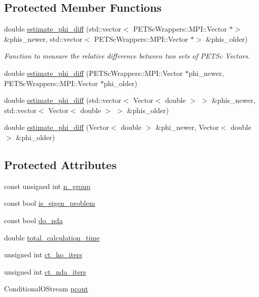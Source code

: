 \subsection*{Protected Member Functions}
\begin{DoxyCompactItemize}
\item 
double \hyperlink{class_iteration_base_a8bcba214850c5d47f5ae38fb98f51a44}{estimate\+\_\+phi\+\_\+diff} (std\+::vector$<$ P\+E\+T\+Sc\+Wrappers\+::\+M\+P\+I\+::\+Vector $\ast$$>$ \&phis\+\_\+newer, std\+::vector$<$ P\+E\+T\+Sc\+Wrappers\+::\+M\+P\+I\+::\+Vector $\ast$$>$ \&phis\+\_\+older)
\begin{DoxyCompactList}\small\item\em Function to measure the relative difference between two sets of P\+E\+T\+Sc Vectors. \end{DoxyCompactList}\item 
double \hyperlink{class_iteration_base_a5b823c5dda090e64bdba2abb815dfbf6}{estimate\+\_\+phi\+\_\+diff} (P\+E\+T\+Sc\+Wrappers\+::\+M\+P\+I\+::\+Vector $\ast$phi\+\_\+newer, P\+E\+T\+Sc\+Wrappers\+::\+M\+P\+I\+::\+Vector $\ast$phi\+\_\+older)
\item 
double \hyperlink{class_iteration_base_aa929c0e69fd2566db98611b810354123}{estimate\+\_\+phi\+\_\+diff} (std\+::vector$<$ Vector$<$ double $>$ $>$ \&phis\+\_\+newer, std\+::vector$<$ Vector$<$ double $>$ $>$ \&phis\+\_\+older)
\item 
double \hyperlink{class_iteration_base_ab46bde988ac6dc1b84ebb78665414785}{estimate\+\_\+phi\+\_\+diff} (Vector$<$ double $>$ \&phi\+\_\+newer, Vector$<$ double $>$ \&phi\+\_\+older)
\end{DoxyCompactItemize}
\subsection*{Protected Attributes}
\begin{DoxyCompactItemize}
\item 
const unsigned int \hyperlink{class_iteration_base_a0c3ec88894828b2bbe3a5ab4fca927ae}{n\+\_\+group}
\item 
const bool \hyperlink{class_iteration_base_af630d420379811fe33e19c1c8691ad7c}{is\+\_\+eigen\+\_\+problem}
\item 
const bool \hyperlink{class_iteration_base_a871d082ca148eb7976f591f99c2ce81b}{do\+\_\+nda}
\item 
double \hyperlink{class_iteration_base_a98cf351c6b85b6bbdc68c914ecdaaf1e}{total\+\_\+calculation\+\_\+time}
\item 
unsigned int \hyperlink{class_iteration_base_afd007145fe5b7bfe22012c44c20d31a4}{ct\+\_\+ho\+\_\+iters}
\item 
unsigned int \hyperlink{class_iteration_base_a1b4bda01b55383e80b0631fbfc339385}{ct\+\_\+nda\+\_\+iters}
\item 
Conditional\+O\+Stream \hyperlink{class_iteration_base_ab057491553962560cfad06f19fb00ff5}{pcout}
\end{DoxyCompactItemize}



